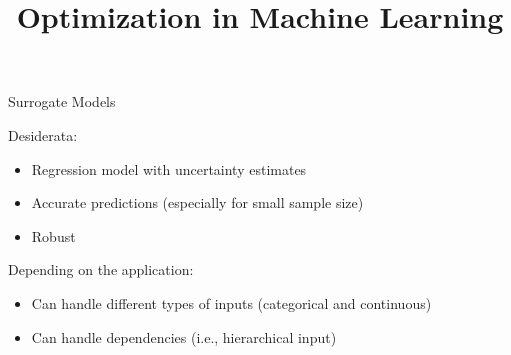 \documentclass[11pt,compress,t,notes=noshow, xcolor=table]{beamer}
\title{Optimization in Machine Learning}
\date{}
\begin{document}

\begin{frame}{Surrogate Models}

Desiderata:

\begin{itemize}
  \item Regression model with uncertainty estimates
  \item Accurate predictions (especially for small sample size)
  \item Robust
\end{itemize}

\vspace{+0.45cm}

Depending on the application:

\begin{itemize}
  \item Can handle different types of inputs (categorical and continuous)
  \item Can handle dependencies (i.e., hierarchical input)
\end{itemize}

\end{frame}
\end{document}
